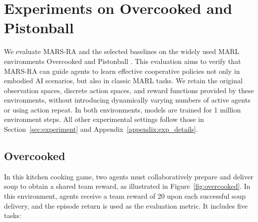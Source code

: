 \documentclass[11pt]{article}
\begin{document}
\section{Experiments on Overcooked and Pistonball}
\label{appendix:more_env}

We evaluate MARS-RA and the selected baselines on the widely used MARL environments Overcooked \cite{carroll2019utility} and Pistonball \cite{terry2021pettingzoo}. This evaluation aims to verify that MARS-RA can guide agents to learn effective cooperative policies not only in embodied AI scenarios, but also in classic MARL tasks. We retain the original observation spaces, discrete action spaces, and reward functions provided by these environments, without introducing dynamically varying numbers of active agents or using action repeat. In both environments, models are trained for 1 million environment steps. All other experimental settings follow those in Section~\ref{sec:experiment} and Appendix~\ref{appendix:exp_details}.

\subsection{Overcooked}
In this kitchen cooking game, two agents must collaboratively prepare and deliver soup to obtain a shared team reward, as illustrated in Figure~\ref{fig:overcooked}. In this environment, agents receive a team reward of 20 upon each successful soup delivery, and the episode return is used as the evaluation metric. It includes five tasks:
\end{document}
